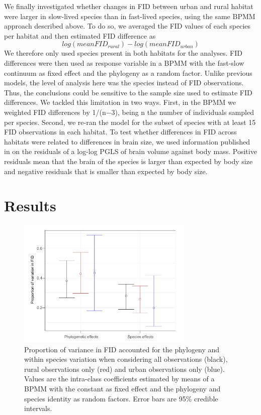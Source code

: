 We finally investigated whether changes in FID between
urban and rural habitat were larger in slow-lived species than
in fast-lived species, using the same BPMM approach described
above. To do so, we averaged the FID values of each
species per habitat and then estimated FID difference as
$$log(mean FID_{rural}) - log(mean FID_{urban})$$
We therefore only
used species present in both habitats for the analyses. FID
differences were then used as response variable in a BPMM
with the fast-slow continuum as fixed effect and the phylogeny
as a random factor. Unlike previous models, the level of
analysis here was the species instead of FID observations.
Thus, the conclusions could be sensitive to the sample size
used to estimate FID differences. We tackled this limitation in
two ways. First, in the BPMM we weighted FID differences
by 1/(n−3), being n the number of individuals sampled per
species. Second, we re-ran the model for the subset of species
with at least 15 FID observations in each habitat. To test
whether differences in FID across habitats were related to
differences in brain size, we used information published in
\citet{Sayol2016} on the residuals of a log-log PGLS of brain
volume against body mass. Positive residuals mean that the
brain of the species is larger than expected by body size and
negative residuals that is smaller than expected by body size.


\section{Results}

\begin{figure}
\centering
\includegraphics[width=0.75\textwidth]{./Figures/chapter04/Fig_1.png}
\caption[Variance in FID accounted for the phylogeny and species]{
Proportion of variance in FID accounted for the phylogeny and
within species variation when considering all observations (black), rural
observations only (red) and urban observations only (blue). Values are the
intra-class coefficients estimated by means of a BPMM with the constant
as fixed effect and the phylogeny and species identity as random factors.
Error bars are 95\% credible intervals.}\label{fig:fig4.1}
\end{figure}

